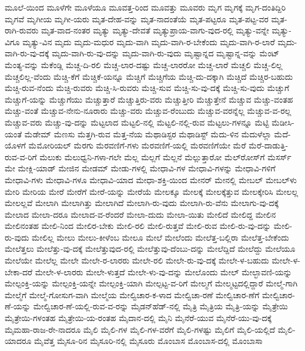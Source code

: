 {ಮೂಲೆ-ಯಿಂದ
ಮೂಳೆಗೇ
ಮೂಳೆಯೂ
ಮೂವತ್ತ-ರಿಂದ
ಮೂವತ್ತು
ಮೂವರು
ಮೃಗ
ಮೃಗಕ್ಕೆ
ಮೃಗ-ದಂತಿದ್ದಿರಿ
ಮೃಗವೆ
ಮೃಗೀಯ
ಮೃಗೀ-ಯರು
ಮೃತ-ದೇಹ-ವನ್ನು
ಮೃತ-ನಾದಂತೆಯೆ
ಮೃತ-ಪಟ್ಟರೂ
ಮೃತ-ಪಟ್ಟ-ವರ
ಮೃತ-ರಾಗಿ-ರುವರು
ಮೃತ-ವಾದ-ನಂತರ
ಮೃತ್ಯು
ಮೃತ್ಯು-ದೇವತೆ
ಮೃತ್ಯುಪ್ರಾಯ-ವಾಗು-ವುದ-ರಲ್ಲಿ
ಮೃತ್ಯು-ವನ್ನೇ
ಮೃತ್ಯು-ವಿಗೂ
ಮೃತ್ಯು-ವಿನ
ಮೃದು
ಮೃದು-ಮಧುರ
ಮೃದು-ವಾಗಿ
ಮೃದು-ವಾಗಿ-ರ-ಬೇಕೆಂದು
ಮೃದು-ವಾಗಿ-ರ-ಲಾರೆ
ಮೃದು-ವಾಗಿ-ರು-ವು-ದಕ್ಕೆ
ಮೃದು-ವಾಗಿ-ರು-ವು-ದನ್ನು
ಮೃದು-ವಾಗಿ-ರು-ವುದು
ಮೃಷ್ಟಾನ್ನದ
ಮೃಷ್ಟಾನ್ನ-ವನ್ನು
ಮೆಂಟ್
ಮೆಂತ್ಯ-ವನ್ನು
ಮೆಕೆಂಡ್ಲಿ
ಮೆಚ್ಚ-ದಿ-ರಲಿ
ಮೆಚ್ಚ-ಲಾರ-ದಷ್ಟು
ಮೆಚ್ಚ-ಲಾರರೋ
ಮೆಚ್ಚ-ಲಾರೆ
ಮೆಚ್ಚಲಿ
ಮೆಚ್ಚ-ಲಿಲ್ಲ
ಮೆಚ್ಚಲಿಲ್ಲ-ವೆಂದು
ಮೆಚ್ಚಿ-ಕೆಗೆ
ಮೆಚ್ಚಿಕೆ-ಯನ್ನೂ
ಮೆಚ್ಚಿಗೆ
ಮೆಚ್ಚಿಗೆಯ
ಮೆಚ್ಚಿ-ದು-ದಕ್ಕಾಗಿ
ಮೆಚ್ಚಿದೆ
ಮೆಚ್ಚಿರ-ಬಹುದು
ಮೆಚ್ಚಿ-ರುವ-ನೆಂದು
ಮೆಚ್ಚಿ-ರುವರು
ಮೆಚ್ಚಿ-ಸಿ-ರುವರು
ಮೆಚ್ಚಿ-ಸುವ
ಮೆಚ್ಚಿ-ಸು-ವು-ದಕ್ಕೆ
ಮೆಚ್ಚಿ-ಸು-ವುದು
ಮೆಚ್ಚುಗೆ
ಮೆಚ್ಚುಗೆ-ಯನ್ನು
ಮೆಚ್ಚುಗೆಯು
ಮೆಚ್ಚುತ್ತಾರೆ
ಮೆಚ್ಚುತ್ತಿರು-ವರು
ಮೆಚ್ಚುತ್ತೀರಿ
ಮೆಚ್ಚುತ್ತೇನೆ
ಮೆಚ್ಚುವ
ಮೆಚ್ಚು-ವಂತಹ
ಮೆಚ್ಚು-ವಂತೆ
ಮೆಚ್ಚುವ-ನೇನು-ನೂರಾರು
ಮೆಚ್ಚು-ವರು
ಮೆಚ್ಚುವ-ರೆಂಬುದು
ಮೆಚ್ಚುವ-ವರನ್ನೆಲ್ಲ
ಮೆಚ್ಚುವ-ವ-ರಲ್ಲ
ಮೆಚ್ಚುವ-ವರು
ಮೆಚ್ಚು-ವು-ದನ್ನು
ಮೆಟ್ಟಲಾದ
ಮೆಟ್ಟಲಿ-ನಲ್ಲಿ
ಮೆಟ್ಟಲಿ-ನಲ್ಲಿ-ರುವ
ಮೆಟ್ಟಲು-ಗಳನ್ನೂ
ಮೆಟ್ಟಿ
ಮೆಡೀಸಿ-ಯಂತೆ
ಮೆಡೇಮ್
ಮೆಣಸು
ಮೆತ್ತಗಿ-ರುವ
ಮೆತ್ತ-ನೆಯ
ಮೆಥಾಡಿಸ್ಟರ
ಮೆಥಾಡಿಸ್ಟ್
ಮೆದು-ಳಿನ
ಮೆದುಳೆಲ್ಲಾ
ಮೆದೆ-ಯೊಳಗೆ
ಮೆಮೋರಿಯಲ್
ಮೆರಗು
ಮೆರವಣಿಗೆ-ಗಳು
ಮೆರವಣಿಗೆ-ಯಲ್ಲಿ
ಮೆರವಣಿಗೆಯೇ
ಮೆರೆ
ಮೆರೆ-ದಾಡುತ್ತಿ-ರುವ-ವ-ರಿಗೆ
ಮೆಲುಕು
ಮೆಲುಧ್ವನಿ-ಗಳಾ-ಗಲೇ
ಮೆಲ್ಲ
ಮೆಲ್ಲಗೆ
ಮೆಲ್ಲನೆ
ಮೆಲ್ಲುತ್ತಾರೋ
ಮೆಲ್‌ರೋಸ್‌ಗೆ
ಮೆಸರ್ಸ್
ಮೇ
ಮೇಕ್ಲಿ-ಯಾಡ್
ಮೇಜಿನ
ಮೇಡಮ್
ಮೇಡು-ಗಳಲ್ಲಿ
ಮೇಧಾವಿ-ಗಳ
ಮೇಧಾವಿ-ಗಳನ್ನು
ಮೇಧಾವಿ-ಗಳಿಗೆ
ಮೇಧಾವಿ-ಗಳು
ಮೇಧಾವಿ-ಗಳೂ
ಮೇಧಾವಿ-ಯಾದ
ಮೇಧಾ-ಶಕ್ತಿ-ಯಿಂದ
ಮೇನರ್
ಮೇನಲ್ಲಿ
ಮೇಬಲ್
ಮೇಬಲ್‌ಳು
ಮೇರಿ
ಮೇರಿಯ
ಮೇರೆ
ಮೇರೆಗೆ
ಮೇರೆ-ಯನ್ನು
ಮೇರೆಯೆ
ಮೇಲಕ್ಕೂ
ಮೇಲಕ್ಕೆ
ಮೇಲಕ್ಕೆತ್ತುವ
ಮೇಲಕ್ಕೇರಿಸಿ
ಮೇಲಲ್ಲ
ಮೇಲಲ್ಲವೆ
ಮೇಲಾಗಿ
ಮೇಲಾಗಿತ್ತು
ಮೇಲಾಗಿದೆ
ಮೇಲಾಗಿ-ರು-ವುದು
ಮೇಲಾಗಿ-ರು-ವೆನು
ಮೇಲಾಗು-ವು-ದಕ್ಕೆ
ಮೇಲಾದ
ಮೇಲಾ-ದರೂ
ಮೇಲಾದ-ವ-ರೆಂದರೆ
ಮೇಲಾ-ದುದು
ಮೇಲಾ-ಯಿತು
ಮೇಲಿದೆ
ಮೇಲಿದ್ದ
ಮೇಲಿನ
ಮೇಲಿನಂತಹ
ಮೇಲಿ-ನಿಂದ
ಮೇಲಿರ-ಬೇಕು
ಮೇಲಿ-ರಲಿ
ಮೇಲಿ-ರುತ್ತವೆ
ಮೇಲಿ-ರುವ
ಮೇಲಿ-ರು-ವು-ದನ್ನು
ಮೇಲಿ-ರು-ವುದು
ಮೇಲಿಲ್ಲ
ಮೇಲು
ಮೇಲು-ಕೀಳೆಂಬ
ಮೇಲೂ
ಮೇಲೆ
ಮೇಲೆಂದು
ಮೇಲೆತ್ತ-ಬಲ್ಲಿರಾ
ಮೇಲೆತ್ತ-ಬೇಕೆಂದು
ಮೇಲೆತ್ತಲು
ಮೇಲೆತ್ತು-ವು-ದಕ್ಕೆ
ಮೇಲೆತ್ತುವುದ-ರಲ್ಲಿ
ಮೇಲೆತ್ತುವು-ದೆಂಬು-ದನ್ನು
ಮೇಲೆದ್ದಿದೆ
ಮೇಲೆದ್ದು
ಮೇಲೆಯೂ
ಮೇಲೆಯೇ
ಮೇಲೆಲ್ಲ
ಮೇಲೇ
ಮೇಲೇ-ರ-ಲಾರರು
ಮೇಲೇ-ರಲಿ
ಮೇಲೇ-ರು-ವು-ದಕ್ಕೆ
ಮೇಲೇ-ಳ-ಬಹುದು
ಮೇಲೇ-ಳ-ಬೇಕಾ-ದರೆ
ಮೇಲೇ-ಳ-ಲಾರರು
ಮೇಲೇ-ಳುತ್ತದೆ
ಮೇಲೇ-ಳು-ವು-ದನ್ನು
ಮೇಲೊಂದು
ಮೇಲ್
ಮೇಲ್ಛಾವಣಿ-ಯನ್ನು
ಮೇಲ್ಪಂಕ್ತಿ-ಯನ್ನು
ಮೇಲ್ಪಂಕ್ತಿ-ಯನ್ನೇ
ಮೇಲ್ಪಂಕ್ತಿ-ಯಾಗಿ
ಮೇಲ್ಪಟ್ಟ-ವ-ರಿಗೆ
ಮೇಲ್ಮಗೆ
ಮೇಲ್ಮಟ್ಟದಲ್ಲಿದ್ದಾರೆ
ಮೇಲ್ಮೆ-ಗಾಗಿ
ಮೇಲ್ಮೆಗೆ
ಮೇಲ್ಮೆ-ಗೋಸುಗ-ವಾಗಿ
ಮೇಲ್ಮೆಯ
ಮೇಲ್ವಿಚಾರ-ಕ-ಳಾದ
ಮೇಲ್ವಿಚಾ-ರಣೆ
ಮೇಲ್ವಿಚಾರ-ಣೆಗೆ
ಮೇಲ್ವಿಚಾರ-ಣೆ-ಯನ್ನು
ಮೇಲ್ವಿಚಾರ-ಣೆ-ಯಲ್ಲಿ-ರುವ-ವ-ರನ್ನು
ಮೈಡನ್‌ಹೆಡ್‌-ನಲ್ಲಿ
ಮೈತ್ರಿ
ಮೈತ್ರಿಯ
ಮೈತ್ರಿ-ಯನ್ನು
ಮೈತ್ರೇಯಿ
ಮೈತ್ರೇಯಿ-ಗಳಂತಹ
ಮೈತ್ರೇಯಿ-ಯ-ರಂತಹ
ಮೈದಾನ-ದಲ್ಲಿ
ಮೈನಿ
ಮೈನೆರೆ-ಯುವ
ಮೈನೆರೆ-ಯು-ವು-ದಕ್ಕೆ
ಮೈಮಹಾ-ರಾಜ-ರೇ-ನಾದರೂ
ಮೈಲಿ
ಮೈಲಿ-ಗಳ
ಮೈಲಿ-ಗಳ-ವರೆಗೆ
ಮೈಲಿ-ಗಳಷ್ಟು
ಮೈಲಿಗೆ
ಮೈಲಿ-ಯಲ್ಲಿದೆ
ಮೈಲಿ-ಯಾದರೂ
ಮೈವೆತ್ತ
ಮೈಸೂ-ರಿನ
ಮೈಸೂರಿ-ನಲ್ಲಿ
ಮೈಸೂರು
ಮೊಂಬಾಸ
ಮೊಂಬಾಸ-ದಲ್ಲಿ
ಮೊಂಬಾಸಾ
}
